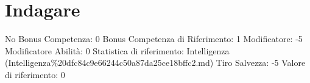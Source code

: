 \section{Indagare}\label{indagare}

\begin{description}
\tightlist
\item[Tags: ABI]
No Bonus Competenza: 0 Bonus Competenza di Riferimento: 1 Modificatore:
-5 Modificatore Abilità: 0 Statistica di riferimento: Intelligenza
(Intelligenza\%20dfc84c9e66244c50a87da25ce18bffc2.md) Tiro Salvezza: -5
Valore di riferimento: 0
\end{description}
